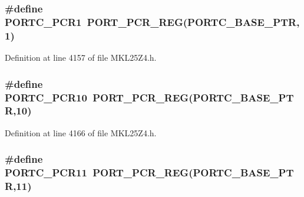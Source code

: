 \subsubsection[{\texorpdfstring{P\+O\+R\+T\+C\+\_\+\+P\+C\+R1}{PORTC_PCR1}}]{\setlength{\rightskip}{0pt plus 5cm}\#define P\+O\+R\+T\+C\+\_\+\+P\+C\+R1~{\bf P\+O\+R\+T\+\_\+\+P\+C\+R\+\_\+\+R\+EG}({\bf P\+O\+R\+T\+C\+\_\+\+B\+A\+S\+E\+\_\+\+P\+TR},1)}\hypertarget{group___p_o_r_t___register___accessor___macros_ga7082550b4e50e24ac7eb94fa46605314}{}\label{group___p_o_r_t___register___accessor___macros_ga7082550b4e50e24ac7eb94fa46605314}


Definition at line 4157 of file M\+K\+L25\+Z4.\+h.

\subsubsection[{\texorpdfstring{P\+O\+R\+T\+C\+\_\+\+P\+C\+R10}{PORTC_PCR10}}]{\setlength{\rightskip}{0pt plus 5cm}\#define P\+O\+R\+T\+C\+\_\+\+P\+C\+R10~{\bf P\+O\+R\+T\+\_\+\+P\+C\+R\+\_\+\+R\+EG}({\bf P\+O\+R\+T\+C\+\_\+\+B\+A\+S\+E\+\_\+\+P\+TR},10)}\hypertarget{group___p_o_r_t___register___accessor___macros_ga2fc705bd24e27e799ef1d01105d1c39f}{}\label{group___p_o_r_t___register___accessor___macros_ga2fc705bd24e27e799ef1d01105d1c39f}


Definition at line 4166 of file M\+K\+L25\+Z4.\+h.

\subsubsection[{\texorpdfstring{P\+O\+R\+T\+C\+\_\+\+P\+C\+R11}{PORTC_PCR11}}]{\setlength{\rightskip}{0pt plus 5cm}\#define P\+O\+R\+T\+C\+\_\+\+P\+C\+R11~{\bf P\+O\+R\+T\+\_\+\+P\+C\+R\+\_\+\+R\+EG}({\bf P\+O\+R\+T\+C\+\_\+\+B\+A\+S\+E\+\_\+\+P\+TR},11)}\hypertarget{group___p_o_r_t___register___accessor___macros_gad183fd746fc2265552ae7c46cd9a8622}{}\label{group___p_o_r_t___register___accessor___macros_gad183fd746fc2265552ae7c46cd9a8622}


